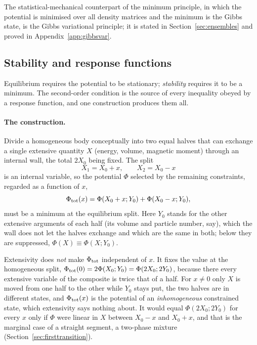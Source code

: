 \documentclass[10pt,a4paper]{article}
\theoremstyle{remark}
\begin{document}
The statistical-mechanical counterpart of the minimum principle, in which the
potential is minimised over all density matrices and the minimum is the Gibbs
state, is the Gibbs variational principle; it is stated in
Section~\ref{sec:ensembles} and proved in Appendix~\ref{app:gibbsvar}.

\subsection{Stability and response functions}
\label{sec:stability}
\label{sec:convexity}

Equilibrium requires the potential to be stationary; \emph{stability} requires
it to be a minimum. The second-order condition is the source of every
inequality obeyed by a response function, and one construction produces them
all.

\paragraph{The construction.} Divide a homogeneous body conceptually into two
equal halves that can exchange a single extensive quantity $X$ (energy,
volume, magnetic moment) through an internal wall, the total $2X_0$ being
fixed. The split
\[
  X_1=X_0+x,\qquad X_2=X_0-x
\]
is an internal variable, so the potential $\Phi$ selected by the remaining
constraints, regarded as a function of $x$,
\[
  \Phi_{\rm tot}(x)=\Phi(X_0+x;Y_0)+\Phi(X_0-x;Y_0) ,
\]
must be a minimum at the equilibrium split. Here $Y_0$ stands for the other
extensive arguments of each half (its volume and particle number, say), which
the wall does not let the halves exchange and which are the same in both;
below they are suppressed, $\Phi(X)\equiv\Phi(X;Y_0)$.

Extensivity does \emph{not} make $\Phi_{\rm tot}$ independent of $x$. It fixes
the value at the homogeneous split, $\Phi_{\rm tot}(0)=2\Phi(X_0;Y_0)=\Phi(2X_0;2Y_0)$,
because there every extensive variable of the composite is twice that of a
half. For $x\neq0$ only $X$ is moved from one half to the other while $Y_0$ stays
put, the two halves are in different states, and $\Phi_{\rm tot}(x)$ is the
potential of an \emph{inhomogeneous} constrained state, which extensivity says
nothing about. It would equal $\Phi(2X_0;2Y_0)$ for every $x$ only if $\Phi$
were linear in $X$ between $X_0-x$ and $X_0+x$, and that is the marginal case of
a straight segment, a two-phase mixture (Section~\ref{sec:firsttransition}).
\end{document}
